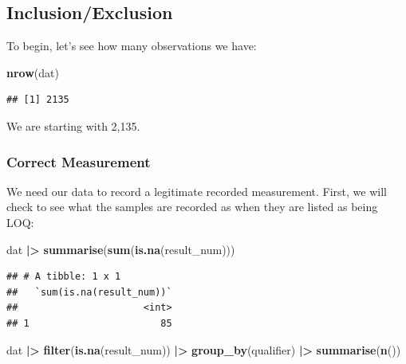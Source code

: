 \documentclass[
]{article}
\newenvironment{Shaded}{\begin{snugshade}}{\end{snugshade}}
\newcommand{\FunctionTok}[1]{\textcolor[rgb]{0.13,0.29,0.53}{\textbf{#1}}}
\newcommand{\NormalTok}[1]{#1}
\newcommand{\SpecialCharTok}[1]{\textcolor[rgb]{0.81,0.36,0.00}{\textbf{#1}}}
\begin{document}
\subsection{Inclusion/Exclusion}\label{inclusionexclusion}

To begin, let's see how many observations we have:

\begin{Shaded}
\begin{Highlighting}[]
\FunctionTok{nrow}\NormalTok{(dat)}
\end{Highlighting}
\end{Shaded}

\begin{verbatim}
## [1] 2135
\end{verbatim}

We are starting with 2,135.

\subsubsection{Correct Measurement}\label{correct-measurement}

We need our data to record a legitimate recorded measurement. First, we
will check to see what the samples are recorded as when they are listed
as being LOQ:

\begin{Shaded}
\begin{Highlighting}[]
\NormalTok{dat }\SpecialCharTok{|\textgreater{}}  
  \FunctionTok{summarise}\NormalTok{(}\FunctionTok{sum}\NormalTok{(}\FunctionTok{is.na}\NormalTok{(result\_num)))}
\end{Highlighting}
\end{Shaded}

\begin{verbatim}
## # A tibble: 1 x 1
##   `sum(is.na(result_num))`
##                      <int>
## 1                       85
\end{verbatim}

\begin{Shaded}
\begin{Highlighting}[]
\NormalTok{dat }\SpecialCharTok{|\textgreater{}} 
  \FunctionTok{filter}\NormalTok{(}\FunctionTok{is.na}\NormalTok{(result\_num)) }\SpecialCharTok{|\textgreater{}} 
  \FunctionTok{group\_by}\NormalTok{(qualifier) }\SpecialCharTok{|\textgreater{}} 
  \FunctionTok{summarise}\NormalTok{(}\FunctionTok{n}\NormalTok{()) }
\end{Highlighting}
\end{Shaded}
\end{document}
